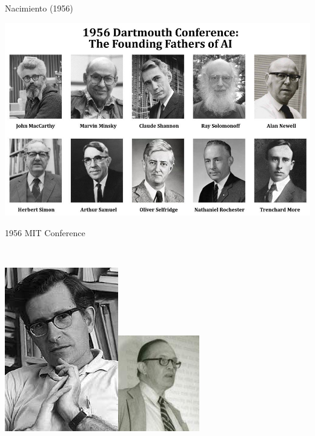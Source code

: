 \documentclass[11pt]{beamer}
\begin{document}
\begin{frame}{Nacimiento (1956)}

\begin{minipage}{.45\linewidth}

\begin{center}

\includegraphics[scale=.15]{imagenes/darmouth_conference.png}

\end{center}

\end{minipage}\hspace{0.5cm}\begin{minipage}{.5\linewidth}

\begin{center}

1956 MIT Conference

\

\includegraphics[scale=.17]{imagenes/Chomsky}\hspace{0.4cm}\includegraphics[scale=.28]{imagenes/Miller}

\end{center}

\end{minipage}

\end{frame}
\end{document}
